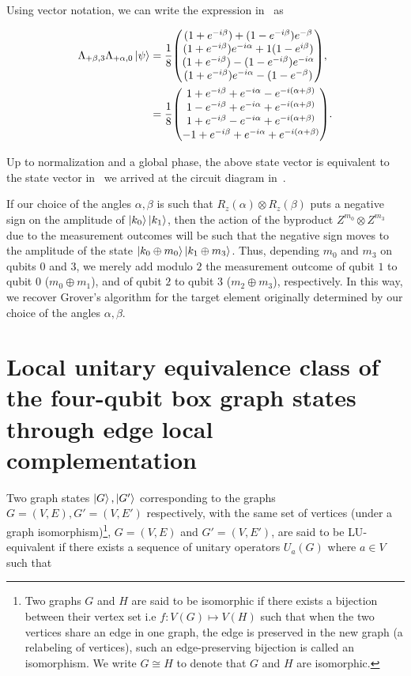 \clearpage
Using vector notation, we can write the expression in~ as 

\begin{align}
    \Lambda_{+\beta, 3}\Lambda_{+\alpha, 0} \ket{\psi}  &= \frac{1}{8}
    \mqty((1+e^{-i\beta}) + (1 - e^{-i\beta})e^{-\beta} \\ (1 +
    e^{-i\beta})e^{-i\alpha} + 1 (1 - e^{i\beta}) \\ (1+e^{-i\beta})
    - (1 - e^{-i\beta})e^{-i\alpha} \\ (1 + e^{-i\beta})e^{-i\alpha} -
    (1 - e^{-\beta})), \nonumber \\
    &=   \frac{1}{8} \mqty(1 + e^{-i\beta} +
 e^{-i\alpha} - e^{-i(\alpha + \beta)} \\ 1 - e^{-i\beta} +
 e^{-i\alpha}  + e^{-i(\alpha + \beta)} \\
 1 + e^{-i\beta} - e^{-i\alpha} + e^{-i(\alpha + \beta)} \\ -1 +
 e^{-i\beta} +
 e^{-i\alpha} + e^{-i(\alpha + \beta)}).
\end{align}

\noindent
Up to normalization and a global phase, the above state vector is equivalent to the state vector in~ we arrived at \via the circuit diagram in~.

\bigskip
\noindent
If our choice of the angles $\alpha,\beta$ is such that $R_z(\alpha) \otimes R_z(\beta)$ puts a negative sign on the amplitude of $\ket{k_0}\ket{k_1}$, then the action of the byproduct $Z^{m_0}\otimes Z^{m_3}$ due to the measurement outcomes will be such that the negative sign moves to the amplitude of the state $\ket{k_0 \oplus m_0}\ket{k_1 \oplus m_3}$. Thus, depending $m_0$ and $m_3$ on qubits $0$ and $3$, we merely add modulo $2$ the measurement outcome of qubit $1$ to qubit $0$ ($m_0 \oplus m_1$), and of qubit $2$ to qubit $3$ ($m_2 \oplus m_3$), respectively. In this way, we recover Grover's algorithm for the target element originally determined by our choice of the angles $\alpha,\beta$.

\section{Local unitary equivalence class of the four-qubit box graph states through edge local complementation}

Two graph states $\ket{G}, \ket{G'}$  corresponding to the graphs $G=(V,E), G'=(V,E')$ respectively, with the same set of vertices (under a graph isomorphism)\footnote{Two graphs $G$ and $H$ are said to be isomorphic if there exists a bijection between their vertex set i.e $ f: V(G) \mapsto V(H)$ such that when the two vertices share an edge in one graph, the edge is preserved in the new graph (\ie a relabeling of vertices), such an edge-preserving bijection is called an isomorphism. We write $G \cong H$ to denote that $G$ and $H$ are isomorphic.}, \ie $G=(V,E)$ and $G'=(V, E')$, are said to be \acs{LU}-equivalent if there exists a sequence of unitary operators $U_a(G)$ where $a \in V$ such that 

